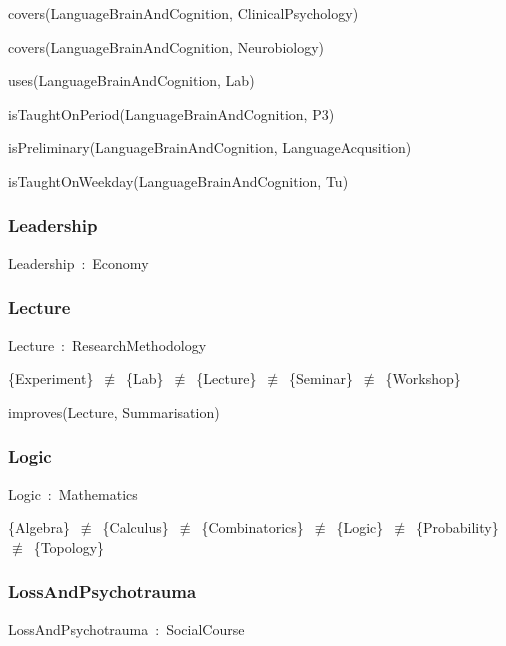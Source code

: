 \documentclass{article}
\begin{document}
covers(LanguageBrainAndCognition, ClinicalPsychology)

covers(LanguageBrainAndCognition, Neurobiology)

uses(LanguageBrainAndCognition, Lab)

isTaughtOnPeriod(LanguageBrainAndCognition, P3)

isPreliminary(LanguageBrainAndCognition, LanguageAcqusition)

isTaughtOnWeekday(LanguageBrainAndCognition, Tu)

\subsubsection*{Leadership}

Leadership~:~Economy

\subsubsection*{Lecture}

Lecture~:~ResearchMethodology

\{Experiment\}~\ensuremath{\not\equiv}~\{Lab\}~\ensuremath{\not\equiv}~\{Lecture\}~\ensuremath{\not\equiv}~\{Seminar\}~\ensuremath{\not\equiv}~\{Workshop\}

improves(Lecture, Summarisation)

\subsubsection*{Logic}

Logic~:~Mathematics

\{Algebra\}~\ensuremath{\not\equiv}~\{Calculus\}~\ensuremath{\not\equiv}~\{Combinatorics\}~\ensuremath{\not\equiv}~\{Logic\}~\ensuremath{\not\equiv}~\{Probability\}~\ensuremath{\not\equiv}~\{Topology\}

\subsubsection*{LossAndPsychotrauma}

LossAndPsychotrauma~:~SocialCourse
\end{document}
